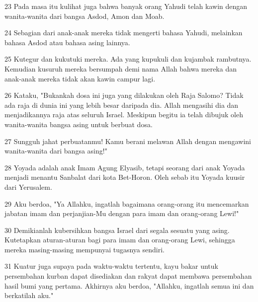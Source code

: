 \par 23 Pada masa itu kulihat juga bahwa banyak orang Yahudi telah kawin dengan wanita-wanita dari bangsa Asdod, Amon dan Moab.
\par 24 Sebagian dari anak-anak mereka tidak mengerti bahasa Yahudi, melainkan bahasa Asdod atau bahasa asing lainnya.
\par 25 Kutegur dan kukutuki mereka. Ada yang kupukuli dan kujambak rambutnya. Kemudian kusuruh mereka bersumpah demi nama Allah bahwa mereka dan anak-anak mereka tidak akan kawin campur lagi.
\par 26 Kataku, "Bukankah dosa ini juga yang dilakukan oleh Raja Salomo? Tidak ada raja di dunia ini yang lebih besar daripada dia. Allah mengasihi dia dan menjadikannya raja atas seluruh Israel. Meskipun begitu ia telah dibujuk oleh wanita-wanita bangsa asing untuk berbuat dosa.
\par 27 Sungguh jahat perbuatanmu! Kamu berani melawan Allah dengan mengawini wanita-wanita dari bangsa asing!"
\par 28 Yoyada adalah anak Imam Agung Elyasib, tetapi seorang dari anak Yoyada menjadi menantu Sanbalat dari kota Bet-Horon. Oleh sebab itu Yoyada kuusir dari Yerusalem.
\par 29 Aku berdoa, "Ya Allahku, ingatlah bagaimana orang-orang itu mencemarkan jabatan imam dan perjanjian-Mu dengan para imam dan orang-orang Lewi!"
\par 30 Demikianlah kubersihkan bangsa Israel dari segala sesuatu yang asing. Kutetapkan aturan-aturan bagi para imam dan orang-orang Lewi, sehingga mereka masing-masing mempunyai tugasnya sendiri.
\par 31 Kuatur juga supaya pada waktu-waktu tertentu, kayu bakar untuk persembahan kurban dapat disediakan dan rakyat dapat membawa persembahan hasil bumi yang pertama. Akhirnya aku berdoa, "Allahku, ingatlah semua ini dan berkatilah aku."



